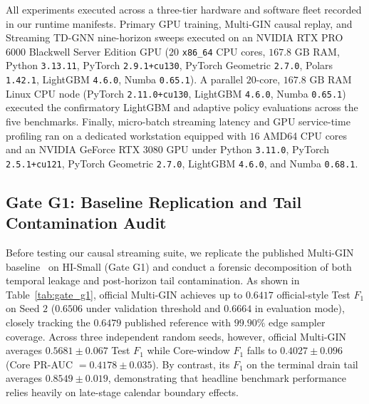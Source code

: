 \documentclass[pdflatex,sn-mathphys,Numbered]{sn-jnl}
\theoremstyle{thmstyleone}
\begin{document}
All experiments executed across a three-tier hardware and software fleet recorded in our runtime manifests. Primary GPU training, Multi-GIN causal replay, and Streaming TD-GNN nine-horizon sweeps executed on an NVIDIA RTX PRO 6000 Blackwell Server Edition GPU ($20$ \texttt{x86\_64} CPU cores, $167.8\text{ GB}$ RAM, Python \texttt{3.13.11}, PyTorch \texttt{2.9.1+cu130}, PyTorch Geometric \texttt{2.7.0}, Polars \texttt{1.42.1}, LightGBM \texttt{4.6.0}, Numba \texttt{0.65.1}). A parallel $20$-core, $167.8\text{ GB}$ RAM Linux CPU node (PyTorch \texttt{2.11.0+cu130}, LightGBM \texttt{4.6.0}, Numba \texttt{0.65.1}) executed the confirmatory LightGBM and adaptive policy evaluations across the five benchmarks. Finally, micro-batch streaming latency and GPU service-time profiling ran on a dedicated workstation equipped with $16$ AMD64 CPU cores and an NVIDIA GeForce RTX 3080 GPU under Python \texttt{3.11.0}, PyTorch \texttt{2.5.1+cu121}, PyTorch Geometric \texttt{2.7.0}, LightGBM \texttt{4.6.0}, and Numba \texttt{0.68.1}.

\subsection{Gate G1: Baseline Replication and Tail Contamination Audit}\label{sec:gate_g1}

Before testing our causal streaming suite, we replicate the published Multi-GIN baseline~\cite{egressy2024multigraph} on HI-Small (Gate G1) and conduct a forensic decomposition of both temporal leakage and post-horizon tail contamination. As shown in Table~\ref{tab:gate_g1}, official Multi-GIN achieves up to $0.6417$ official-style Test $F_1$ on Seed $2$ ($0.6506$ under validation threshold and $0.6664$ in evaluation mode), closely tracking the $0.6479$ published reference with $99.90\%$ edge sampler coverage. Across three independent random seeds, however, official Multi-GIN averages $0.5681 \pm 0.067$ Test $F_1$ while Core-window $F_1$ falls to $0.4027 \pm 0.096$ (Core PR-AUC $= 0.4178 \pm 0.035$). By contrast, its $F_1$ on the terminal drain tail averages $0.8549 \pm 0.019$, demonstrating that headline benchmark performance relies heavily on late-stage calendar boundary effects.
\end{document}
